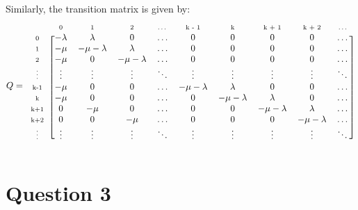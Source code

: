 \documentclass[12pt]{article}
\newcommand{\matindex}[1]{\mbox{\scriptsize#1}}%
\begin{document}
\noindent Similarly, the transition matrix is given by: \begin{equation*}
    Q = \begin{blockarray}{cccccccccc}
        & \matindex{0} & \matindex{1} & \matindex{2} & \matindex{\dots} & \matindex{k - 1} & \matindex{k} & \matindex{k + 1} & \matindex{k + 2} & \matindex{\dots} \\
        \begin{block}{c[ccccccccc]}
            \matindex{0} & -\lambda & \lambda & 0 & \dots & 0 & 0 & 0 & 0 & \dots \\ 
            \matindex{1} & -\mu & -\mu-\lambda & \lambda & \dots & 0 & 0 & 0 & 0 & \dots \\ 
            \matindex{2} & -\mu & 0 & -\mu-\lambda & \dots & 0 & 0 & 0 & 0 & \dots \\ 
            \matindex{\vdots} & \vdots & \vdots & \vdots & \ddots & \vdots & \vdots & \vdots & \vdots & \ddots \\ 
            \matindex{k-1} & -\mu & 0 & 0 & \dots & -\mu-\lambda & \lambda & 0 & 0 & \dots \\ 
            \matindex{k} & -\mu & 0 & 0 & \dots & 0 & -\mu-\lambda & \lambda & 0 & \dots \\ 
            \matindex{k+1} & 0 & -\mu & 0 & \dots & 0 & 0 & -\mu-\lambda & \lambda & \dots \\ 
            \matindex{k+2} & 0 & 0 & -\mu & \dots & 0 & 0 & 0 & -\mu-\lambda & \dots \\ 
            \matindex{\vdots} & \vdots & \vdots & \vdots & \ddots & \vdots & \vdots & \vdots & \vdots & \ddots \\ 
        \end{block}
    \end{blockarray}
\end{equation*}

\section*{Question 3}
\end{document}
